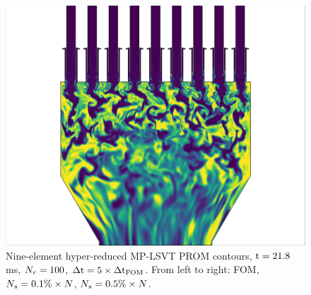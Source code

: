 \begin{figure}
{\begin{minipage}{0.32\linewidth}
		\includegraphics[width=0.99\linewidth,trim={0.5em 0.5em 15.0em 0.5em},clip]{Chapters/HPROMResults/Images/nineElem/deim/contours/deim_0p005_co_z.png}
	\end{minipage}
	}

	\caption{\label{fig:nineElemDEIMContours}Nine-element hyper-reduced MP-LSVT PROM contours, $\text{t} = 21.8$ms, $N_r = 100$, $\Delta \text{t} = 5 \times \Delta \text{t}_{\text{FOM}}$. From left to right: FOM, $N_s = 0.1\% \times N$, $N_s = 0.5\% \times N$.}
\end{figure}




